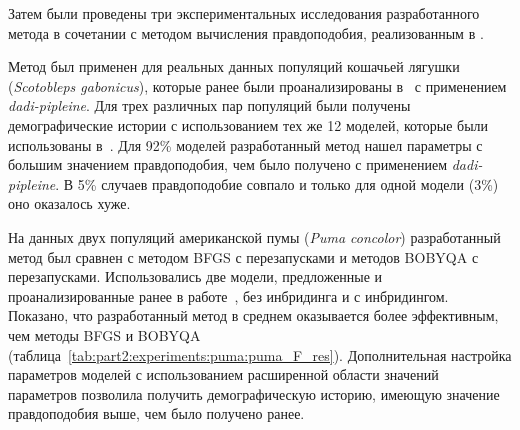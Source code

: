 \begin{table}[bh!]
    \caption{Результаты экспериментальных исследований сравнения методов настройки параметров на симулированных данных трех популяций}
\end{table}


Затем были проведены три экспериментальных исследования разработанного метода в сочетании с методом вычисления правдоподобия, реализованным в \dadi.

Метод был применен для реальных данных популяций кошачьей лягушки (\textit{Scotobleps gabonicus}), которые ранее были проанализированы в~\cite{portik2017evaluating} с применением \textit{dadi-pipleine}.
Для трех различных пар популяций были получены демографические истории с использованием тех же 12 моделей, которые были использованы в~\cite{portik2017evaluating}.
Для 92\% моделей разработанный метод нашел параметры с большим значением правдоподобия, чем было получено с применением \textit{dadi-pipleine}.
В 5\% случаев правдоподобие совпало и только для одной модели (3\%) оно оказалось хуже.

На данных двух популяций американской пумы (\textit{Puma concolor}) разработанный метод был сравнен с методом BFGS с перезапусками и методов BOBYQA с перезапусками.
Использовались две модели, предложенные и проанализированные ранее в работе~\cite{blischak2020inferring}, без инбридинга и с инбридингом.
Показано, что разработанный метод в среднем оказывается более эффективным, чем методы BFGS и BOBYQA (таблица~\ref{tab:part2:experiments:puma:puma_F_res}).
Дополнительная настройка параметров моделей с использованием расширенной области значений параметров позволила получить демографическую историю, имеющую значение правдоподобия выше, чем было получено ранее.

